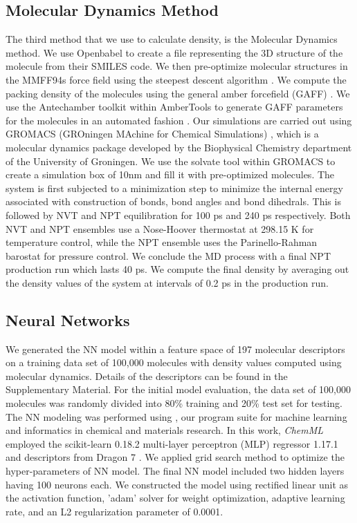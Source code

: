 \subsection{Molecular Dynamics Method}
\label{subsec:mdmethod}

The third method that we use to calculate density, is the Molecular Dynamics method. We use Openbabel to create a file representing the 3D structure of the molecule from their SMILES code. We then pre-optimize molecular structures in the MMFF94s force field using the steepest descent algorithm \cite{OBoyle2011}. We compute the packing density of the molecules using the general amber forcefield (GAFF) \cite{Wang2004}. We use the Antechamber toolkit within AmberTools to generate GAFF parameters for the molecules in an automated fashion \cite{Wang2006a}. Our simulations are carried out using GROMACS (GROningen MAchine for Chemical Simulations) \cite{Beredsen1995}, which is a molecular dynamics package developed by the Biophysical Chemistry department of the University of Groningen. We use the solvate tool within GROMACS to create a simulation box of 10nm and fill it with pre-optimized molecules. The system is first subjected to a minimization step to minimize the internal energy associated with construction of bonds, bond angles and bond dihedrals. This is followed by NVT and NPT equilibration for 100 ps and 240 ps respectively. Both NVT and NPT ensembles use a Nose-Hoover thermostat at 298.15 K for temperature control, while the NPT ensemble uses the Parinello-Rahman barostat for pressure control. We conclude the MD process with a final NPT production run which lasts 40 ps. We compute the final density by averaging out the density values of the system at intervals of 0.2 ps in the production run. 


\subsection{Neural Networks}
\label{subsec:nn}

We generated the NN model within a feature space of 197 molecular descriptors on a training data set of 100,000 molecules with density values computed using molecular dynamics. Details of the descriptors can be found in the Supplementary Material. For the initial model evaluation, the data set of 100,000 molecules was randomly divided into 80\% training and 20\% test set for testing. 
The NN modeling was performed using  \cite{Haghighatlari2017}, our program suite for machine learning and informatics in chemical and materials research. In this work, \textit{ChemML} employed the scikit-learn 0.18.2 multi-layer perceptron (MLP) regressor 1.17.1 \cite{scikit-learn} and descriptors from Dragon 7 \cite{Taletesrl2011}. We applied grid search method to optimize the hyper-parameters of NN model.
The final NN model included two hidden layers having 100 neurons each. 	We constructed the model using rectified linear unit as the activation function, 'adam' solver for weight optimization, adaptive learning rate, and an L2 regularization parameter of 0.0001. 

